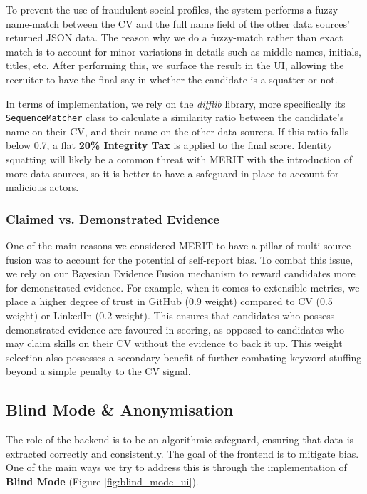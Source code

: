 To prevent the use of fraudulent social profiles, the system performs a fuzzy name-match between the
CV and the full name field of the other data sources' returned JSON data. The reason why we do a fuzzy-match rather than exact match
is to account for minor variations in details such as middle names, initials, titles, etc. After performing this, we surface the 
result in the UI, allowing the recruiter to have the final say in whether the candidate is a squatter or not.

In terms of implementation, we rely on the \textit{difflib} library, more specifically its \texttt{SequenceMatcher} class to calculate a
similarity ratio between the candidate's name on their CV, and their name on the other data sources. If this ratio falls below 0.7, a
flat \textbf{20\% Integrity Tax} is applied to the final score. Identity squatting will likely be a common threat with MERIT with the 
introduction of more data sources, so it is better to have a safeguard in place to account for malicious actors.

\subsubsection{Claimed vs. Demonstrated Evidence}
One of the main reasons we considered MERIT to have a pillar of multi-source fusion was to account for the potential of self-report bias.
To combat this issue, we rely on our Bayesian Evidence Fusion mechanism to reward candidates more for demonstrated evidence.
For example, when it comes to extensible metrics, we place a higher degree of trust in GitHub (0.9 weight) compared to CV 
(0.5 weight) or LinkedIn (0.2 weight). This ensures that candidates who possess demonstrated evidence are favoured in 
scoring, as opposed to candidates who may claim skills on their CV without the evidence to back it up. This weight selection
also possesses a secondary benefit of further combating keyword stuffing beyond a simple penalty to the CV signal.

\subsection{Blind Mode \& Anonymisation}
The role of the backend is to be an algorithmic safeguard, ensuring that data is extracted correctly and consistently.
The goal of the frontend is to mitigate bias. One of the main ways we try to address this is through the 
implementation of \textbf{Blind Mode} (Figure \ref{fig:blind_mode_ui}).

